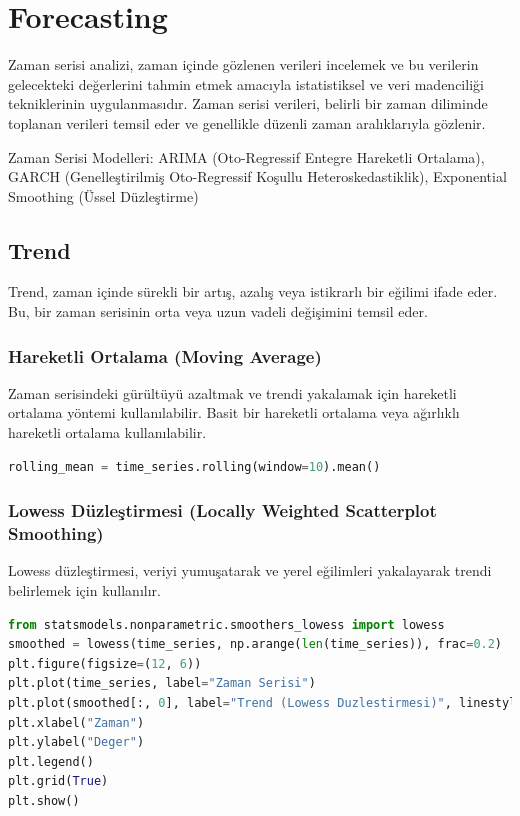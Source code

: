 \section{Forecasting}
Zaman serisi analizi, zaman içinde gözlenen verileri incelemek ve bu verilerin gelecekteki değerlerini tahmin etmek amacıyla istatistiksel ve veri madenciliği tekniklerinin uygulanmasıdır. Zaman serisi verileri, belirli bir zaman diliminde toplanan verileri temsil eder ve genellikle düzenli zaman aralıklarıyla gözlenir.

Zaman Serisi Modelleri: ARIMA (Oto-Regressif Entegre Hareketli Ortalama), GARCH (Genelleştirilmiş Oto-Regressif Koşullu Heteroskedastiklik), Exponential Smoothing (Üssel Düzleştirme)

\newpage

\subsection{Trend}
Trend, zaman içinde sürekli bir artış, azalış veya istikrarlı bir eğilimi ifade eder. Bu, bir zaman serisinin orta veya uzun vadeli değişimini temsil eder.

\subsubsection{Hareketli Ortalama (Moving Average)}

Zaman serisindeki gürültüyü azaltmak ve trendi yakalamak için hareketli ortalama yöntemi kullanılabilir. Basit bir hareketli ortalama veya ağırlıklı hareketli ortalama kullanılabilir.

\begin{lstlisting}[language=Python]
rolling_mean = time_series.rolling(window=10).mean()
\end{lstlisting}

\subsubsection{Lowess Düzleştirmesi (Locally Weighted Scatterplot Smoothing)}

Lowess düzleştirmesi, veriyi yumuşatarak ve yerel eğilimleri yakalayarak trendi belirlemek için kullanılır.

\begin{lstlisting}[language=Python]
from statsmodels.nonparametric.smoothers_lowess import lowess
smoothed = lowess(time_series, np.arange(len(time_series)), frac=0.2)
plt.figure(figsize=(12, 6))
plt.plot(time_series, label="Zaman Serisi")
plt.plot(smoothed[:, 0], label="Trend (Lowess Duzlestirmesi)", linestyle="--")
plt.xlabel("Zaman")
plt.ylabel("Deger")
plt.legend()
plt.grid(True)
plt.show()
\end{lstlisting}

